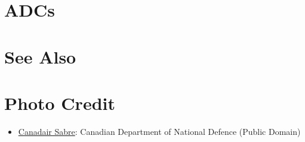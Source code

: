 \section{ADCs}

\begin{adclist}
\end{adclist}

\section{See Also}

\begin{typelist}
\end{typelist}

\section{Photo Credit}
\begin{itemize}\raggedright
    \item \href{https://commons.wikimedia.org/wiki/File:Canadair_Sabre_0258.jpg}{Canadair Sabre}: Canadian Department of National Defence (Public Domain)
\end{itemize}
